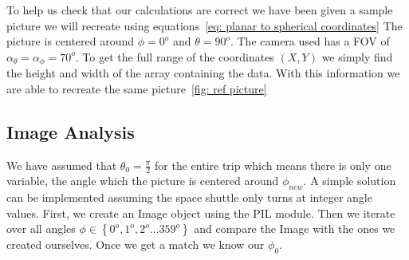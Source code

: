 \documentclass[reprint,english,notitlepage]{revtex4-2}
\begin{document}
To help us check that our calculations are correct we have been given a sample picture we will recreate using equations~\ref{eq: planar to spherical coordinates}
The picture is centered around $ \phi = 0^{o} $ and $ \theta = 90^{o} $.
The camera used has a FOV of $ \alpha_{\theta} = \alpha_{\phi} = 70^{o} $.
To get the full range of the coordinates $ (X,Y) $ we simply find the height and width of the array containing the data.
With this information we are able to recreate the same picture~\ref{fig: ref picture}


\subsection{Image Analysis} \label{ssec: image analysis}
We have assumed that $ \theta_{0} = \frac{\pi}{2} $ for the entire trip which means there is only one variable, the angle which the picture is centered around $ \phi_{new} $.
A simple solution can be implemented assuming the space shuttle only turns at integer angle values.
First, we create an Image object using the PIL module.
Then we iterate over all angles $ \phi \in  \left\{ 0^{o}, 1^{o}, 2^{o} \dots 359 ^{o} \right\}  $ and compare the Image with the ones we created ourselves.
Once we get a match we know our $ \phi _{0} $.
\end{document}
